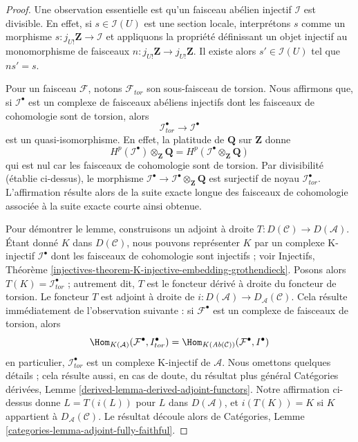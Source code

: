 \begin{proof}
Une observation essentielle est qu'un faisceau abélien injectif
$\mathcal{I}$ est divisible. En effet, si $s \in \mathcal{I}(U)$ est une
section locale, interprétons $s$ comme un morphisme
$s : j_{U!}\mathbf{Z} \to \mathcal{I}$ et appliquons la propriété
définissant un objet injectif au monomorphisme de faisceaux
$n : j_{U!}\mathbf{Z} \to j_{U!}\mathbf{Z}$. Il existe alors
$s' \in \mathcal{I}(U)$ tel que $ns' = s$.

\medskip\noindent
Pour un faisceau $\mathcal{F}$, notons $\mathcal{F}_{tor}$ son sous-faisceau
de torsion. Nous affirmons que, si $\mathcal{I}^\bullet$ est un complexe
de faisceaux abéliens injectifs dont les faisceaux de cohomologie sont de
torsion, alors
$$
\mathcal{I}^\bullet_{tor} \to \mathcal{I}^\bullet
$$
est un quasi-isomorphisme. En effet, la platitude de $\mathbf{Q}$ sur
$\mathbf{Z}$ donne
$$
H^p(\mathcal{I}^\bullet) \otimes_\mathbf{Z} \mathbf{Q} =
H^p(\mathcal{I}^\bullet \otimes_\mathbf{Z} \mathbf{Q})
$$
qui est nul car les faisceaux de cohomologie sont de torsion. Par
divisibilité (établie ci-dessus), le morphisme
$\mathcal{I}^\bullet \to \mathcal{I}^\bullet \otimes_\mathbf{Z} \mathbf{Q}$
est surjectif de noyau $\mathcal{I}^\bullet_{tor}$. L'affirmation résulte
alors de la suite exacte longue des faisceaux de cohomologie associée à la
suite exacte courte ainsi obtenue.

\medskip\noindent
Pour démontrer le lemme, construisons un adjoint à droite
$T : D(\mathcal{C}) \to D(\mathcal{A})$. Étant donné $K$ dans
$D(\mathcal{C})$, nous pouvons représenter $K$ par un complexe K-injectif
$\mathcal{I}^\bullet$ dont les faisceaux de cohomologie sont injectifs ;
voir Injectifs, Théorème
\ref{injectives-theorem-K-injective-embedding-grothendieck}. Posons alors
$T(K) = \mathcal{I}^\bullet_{tor}$ ; autrement dit, $T$ est le foncteur
dérivé à droite du foncteur de torsion. Le foncteur $T$ est adjoint à
droite de $i : D(\mathcal{A}) \to D_\mathcal{A}(\mathcal{C})$. Cela résulte
immédiatement de l'observation suivante : si $\mathcal{F}^\bullet$ est un
complexe de faisceaux de torsion, alors
$$
\Hom_{K(\mathcal{A})}(\mathcal{F}^\bullet, I^\bullet_{tor}) =
\Hom_{K(\textit{Ab}(\mathcal{C}))}(\mathcal{F}^\bullet, I^\bullet)
$$
en particulier, $\mathcal{I}^\bullet_{tor}$ est un complexe K-injectif de
$\mathcal{A}$. Nous omettons quelques détails ; cela résulte aussi, en cas
de doute, du résultat plus général Catégories dérivées, Lemme
\ref{derived-lemma-derived-adjoint-functors}. Notre affirmation ci-dessus
donne $L = T(i(L))$ pour $L$ dans $D(\mathcal{A})$, et $i(T(K)) = K$ si
$K$ appartient à $D_\mathcal{A}(\mathcal{C})$. Le résultat découle alors
de Catégories, Lemme \ref{categories-lemma-adjoint-fully-faithful}.
\end{proof}




